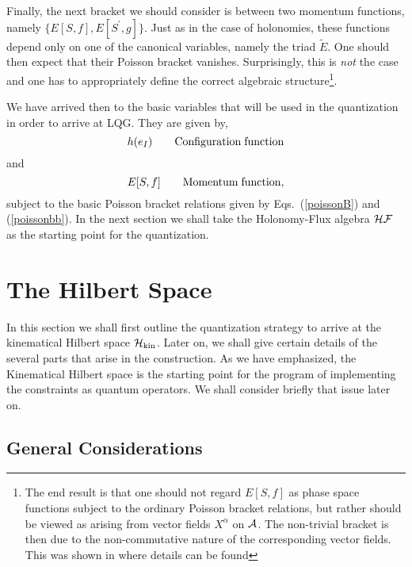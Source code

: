 \documentclass[aps,prd,tightenlines,showpacs,nofootinbib,preprint]{revtex4}
\def\be{\begin{equation}}
\def\ee{\end{equation}}
\def\tE{\tilde{E}}
\begin{document}
Finally, the next bracket we should consider is between two
momentum functions, namely $\{E[S,f],E[S^\prime,g]\}$. Just as in
the case of holonomies, these functions depend only on one of the
canonical variables, namely the triad $\tE$. One should then
expect that their Poisson bracket vanishes. Surprisingly, this is
{\it not} the case and one has to appropriately define the correct
algebraic structure\footnote{The end result is that one should not
regard $E[S,f]$ as phase space functions subject to the ordinary
Poisson bracket relations, but rather should be viewed as arising
from vector fields $X^\alpha$ on ${\cal A}$. The non-trivial
bracket is then due to the non-commutative nature of the
corresponding vector fields. This was shown in \cite{ACZ} where
details can be found}.

We have arrived then to the basic variables that will be used in the
quantization in order to arrive at LQG. They are given by,
%
\be
h(e_I)\qquad {\rm Configuration \; function}
\ee
and
\be
  E[S,f]\qquad {\rm Momentum \; function},
\ee subject to the basic Poisson bracket relations given by
Eqs.~(\ref{poissonB}) and (\ref{poissonbb}). In the next section
we shall take the Holonomy-Flux algebra ${\cal HF}$ as the
starting point for the quantization.
%





\section{The Hilbert Space}
\label{sec:4}

\noindent In this section we shall first outline the quantization
strategy to arrive at the kinematical Hilbert space ${\cal H}_{\rm
kin}$. Later on, we shall give certain details of the several
parts that arise in the construction. As we have emphasized, the
Kinematical Hilbert space is the starting point for the program of
implementing the constraints as quantum operators. We shall
consider briefly that issue later on.

\subsection{General Considerations}
\end{document}
